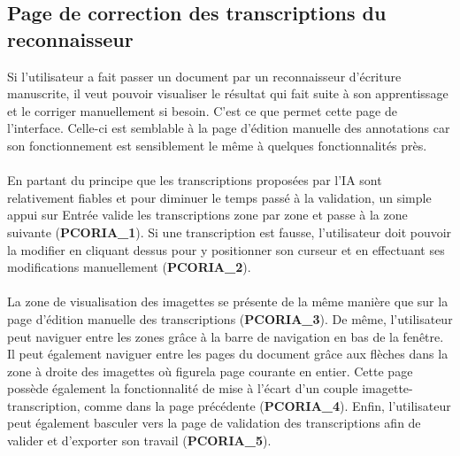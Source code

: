 \subsection{Page de correction des transcriptions du reconnaisseur}

Si l’utilisateur a fait passer un document par un reconnaisseur d’écriture
manuscrite, il veut pouvoir visualiser le résultat qui fait suite à son
apprentissage et le corriger manuellement si besoin. C’est ce que permet
cette page de l’interface. Celle-ci est semblable à la page d’édition manuelle
des annotations car son fonctionnement est sensiblement le même à quelques
fonctionnalités près.

\paragraph{}
En partant du principe que les transcriptions proposées par l’IA sont
relativement fiables et pour diminuer le temps passé à la validation, un simple
appui sur Entrée valide les transcriptions zone par zone et passe à la zone
suivante (\textbf{PCORIA\_1}). Si une transcription est fausse, l’utilisateur
doit pouvoir la modifier en cliquant dessus pour y positionner son curseur et
en effectuant ses modifications manuellement (\textbf{PCORIA\_2}).

\paragraph{}
La zone de visualisation des imagettes se présente de la même manière que sur
la page d’édition manuelle des transcriptions (\textbf{PCORIA\_3}). De même, 
l’utilisateur peut naviguer entre les zones grâce à la barre de navigation en 
bas de la fenêtre. Il peut également naviguer entre les pages du document grâce 
aux flèches dans la zone à droite des imagettes où figurela page courante 
en entier. Cette page
possède également la fonctionnalité de mise à l’écart d’un couple
imagette-transcription, comme dans la page précédente (\textbf{PCORIA\_4}).
Enfin, l’utilisateur peut également basculer vers la page de validation des
transcriptions afin de valider et d’exporter son travail (\textbf{PCORIA\_5}).

\newpage

